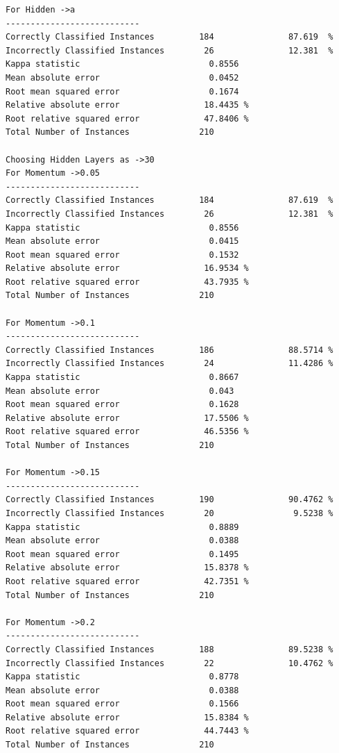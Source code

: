 \documentclass[fontsize=10pt,DIV=14]{scrartcl}
\begin{document}
\begin{itemize}
\begin{verbatim}
For Hidden ->a 
---------------------------
Correctly Classified Instances         184               87.619  %
Incorrectly Classified Instances        26               12.381  %
Kappa statistic                          0.8556
Mean absolute error                      0.0452
Root mean squared error                  0.1674
Relative absolute error                 18.4435 %
Root relative squared error             47.8406 %
Total Number of Instances              210     

Choosing Hidden Layers as ->30
For Momentum ->0.05 
---------------------------
Correctly Classified Instances         184               87.619  %
Incorrectly Classified Instances        26               12.381  %
Kappa statistic                          0.8556
Mean absolute error                      0.0415
Root mean squared error                  0.1532
Relative absolute error                 16.9534 %
Root relative squared error             43.7935 %
Total Number of Instances              210     

For Momentum ->0.1 
---------------------------
Correctly Classified Instances         186               88.5714 %
Incorrectly Classified Instances        24               11.4286 %
Kappa statistic                          0.8667
Mean absolute error                      0.043 
Root mean squared error                  0.1628
Relative absolute error                 17.5506 %
Root relative squared error             46.5356 %
Total Number of Instances              210     

For Momentum ->0.15 
---------------------------
Correctly Classified Instances         190               90.4762 %
Incorrectly Classified Instances        20                9.5238 %
Kappa statistic                          0.8889
Mean absolute error                      0.0388
Root mean squared error                  0.1495
Relative absolute error                 15.8378 %
Root relative squared error             42.7351 %
Total Number of Instances              210     

For Momentum ->0.2 
---------------------------
Correctly Classified Instances         188               89.5238 %
Incorrectly Classified Instances        22               10.4762 %
Kappa statistic                          0.8778
Mean absolute error                      0.0388
Root mean squared error                  0.1566
Relative absolute error                 15.8384 %
Root relative squared error             44.7443 %
Total Number of Instances              210     


\end{verbatim}
\end{itemize}
\end{document}
